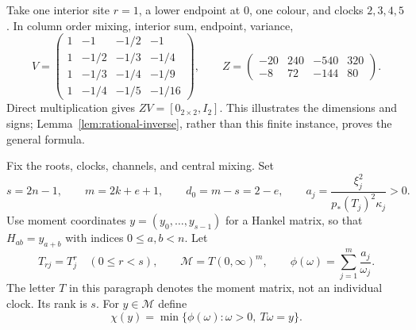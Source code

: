 \begin{example}\label{ex:four-clock-inverse}
Take one interior site $r=1$, a lower endpoint at $0$, one colour, and clocks $2,3,4,5$. In column order mixing, interior sum, endpoint, variance,
\[
 V=\begin{pmatrix}
 1&-1&-1/2&-1\\
 1&-1/2&-1/3&-1/4\\
 1&-1/3&-1/4&-1/9\\
 1&-1/4&-1/5&-1/16
 \end{pmatrix},\qquad
 Z=\begin{pmatrix}-20&240&-540&320\\-8&72&-144&80\end{pmatrix}.
\]
Direct multiplication gives $ZV=[0_{2\times2},I_2]$. This illustrates the dimensions and signs; Lemma~\ref{lem:rational-inverse}, rather than this finite instance, proves the general formula.
\end{example}

Fix the roots, clocks, channels, and central mixing. Set
\[
 s=2n-1,\qquad m=2k+e+1,\qquad d_0=m-s=2-e,
 \qquad a_j=\frac{\xi_j^2}{p_*(T_j)^2\kappa_j}>0.
\]
Use moment coordinates $y=(y_0,\ldots,y_{s-1})$ for a Hankel matrix, so that $H_{ab}=y_{a+b}$ with indices $0\le a,b<n$. Let
\[
 T_{rj}=T_j^r\quad(0\le r<s),\qquad
 \mathscr M=T(0,\infty)^m,\qquad
 \phi(\omega)=\sum_{j=1}^m\frac{a_j}{\omega_j}.
\]
The letter $T$ in this paragraph denotes the moment matrix, not an individual clock. Its rank is $s$. For $y\in\mathscr M$ define
\begin{equation}\label{eq:budget-gauge}
 \chi(y)=\min\{\phi(\omega):\omega>0,\ T\omega=y\}.
\end{equation}


